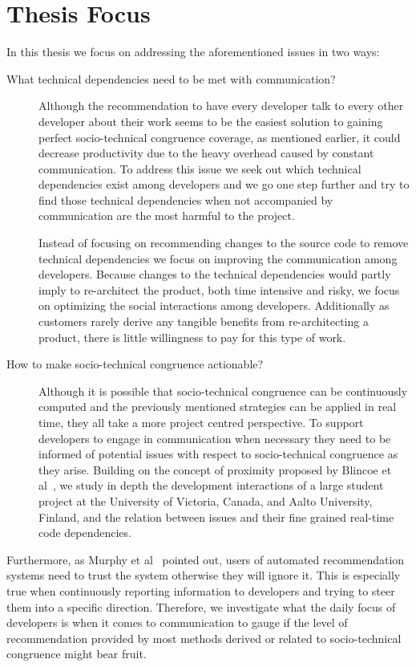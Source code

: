 \section{Thesis Focus}
In this thesis we focus on addressing the aforementioned issues in two ways:
\begin{description}
\item[What technical dependencies need to be met with communication?] 
Although the recommendation to have every developer talk to every other developer about their work seems to be the easiest solution to gaining perfect socio-technical congruence coverage, as mentioned earlier, it could decrease productivity due to the heavy overhead caused by  constant communication.
To address this issue we seek out which technical dependencies exist among developers and we go one step further and try to find those technical dependencies when not accompanied by communication are the most harmful to the project.

Instead of focusing on recommending changes to the source code to remove technical dependencies we focus on improving the communication among developers.
Because changes to the technical dependencies would partly imply to re-architect the product, both time intensive and risky, we focus on optimizing the social interactions among developers.
Additionally as customers rarely derive any tangible benefits from re-architecting a product, there is little willingness to pay for this type of work.

\item[How to make socio-technical congruence actionable?] Although it is possible that socio-technical congruence can be continuously computed and the previously mentioned strategies can be applied in real time, they all take a more project centred perspective.
To support developers to engage in communication when necessary they need to be informed of potential issues with respect to socio-technical congruence as they arise.
Building on the concept of proximity proposed by Blincoe et al~\cite{blincoe:cscw:2012}, we study in depth the development interactions of a large student project at the University of Victoria, Canada, and Aalto University, Finland, and the relation between issues and their fine grained real-time code dependencies.
\end{description}

Furthermore, as Murphy et al~\cite{murphy:rsse:2010} pointed out, users of automated recommendation systems need to trust the system otherwise they will ignore it.
This is especially true when continuously reporting information to developers and trying to steer them into a specific direction.
Therefore, we investigate what the daily focus of developers is when it comes to communication to gauge if the level of recommendation provided by most methods derived or related to socio-technical congruence might bear fruit.




